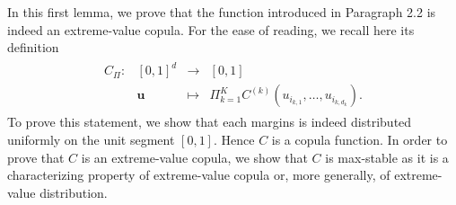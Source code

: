 \documentclass[11pt]{article}
\begin{document}
        In this first lemma, we prove that the function introduced in Paragraph 2.2 is indeed an extreme-value copula. For the ease of reading, we recall here its definition
        \begin{align*}
			\begin{array}{lrcl}
C_{\Pi} : & [0,1]^d & \longrightarrow & [0,1] \\
    & \textbf{u} & \longmapsto & \Pi_{k=1}^K C^{(k)}(u_{i_{k,1}}, \dots, u_{i_{k,d_k}}). \end{array}
		\end{align*}
		To prove this statement, we show that each margins is indeed distributed uniformly on the unit segment $[0,1]$. Hence $C$ is a copula function. In order to prove that $C$ is an extreme-value copula, we show that $C$ is max-stable as it is a characterizing property of extreme-value copula or, more generally, of extreme-value distribution.
\end{document}
